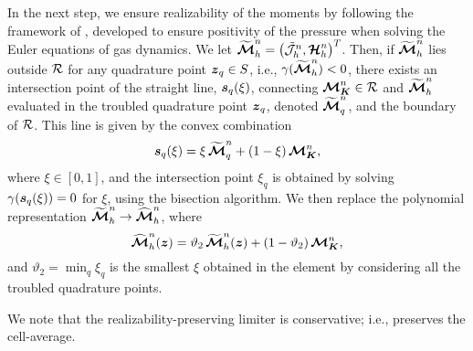 In the next step, we ensure realizability of the moments by following the framework of \cite{zhangShu_2010b}, developed to ensure positivity of the pressure when solving the Euler equations of gas dynamics.  
We let $\widetilde{\boldsymbol{\mathcal{M}}}_{h}^{n}=\big(\tilde{\mathcal{J}}_{h}^{n},\boldsymbol{\mathcal{H}}_{h}^{n}\big)^{T}$.  
Then, if $\widetilde{\boldsymbol{\mathcal{M}}}_{h}^{n}$ lies outside $\mathcal{R}$ for any quadrature point $\boldsymbol{z}_{q}\in S$, i.e., $\gamma(\widetilde{\boldsymbol{\mathcal{M}}}_{h}^{n})<0$, there exists an intersection point of the straight line, $\boldsymbol{s}_{q}(\xi)$, connecting $\boldsymbol{\mathcal{M}}_{\boldsymbol{K}}^{n}\in\mathcal{R}$ and $\widetilde{\boldsymbol{\mathcal{M}}}_{h}^{n}$ evaluated in the troubled quadrature point $\boldsymbol{z}_{q}$, denoted $\widetilde{\boldsymbol{\mathcal{M}}}_{q}^{n}$, and the boundary of $\mathcal{R}$.  
This line is given by the convex combination 
\begin{equation}
  \boldsymbol{s}_{q}(\xi)=\xi\,\widetilde{\boldsymbol{\mathcal{M}}}_{q}^{n}+(1-\xi)\,\boldsymbol{\mathcal{M}}_{\boldsymbol{K}}^{n},
\end{equation}
where $\xi\in[0,1]$, and the intersection point $\xi_{q}$ is obtained by solving $\gamma(\boldsymbol{s}_{q}(\xi))=0$ for $\xi$, using the bisection algorithm.  
We then replace the polynomial representation $\widetilde{\boldsymbol{\mathcal{M}}}_{h}^{n}\to\widehat{\boldsymbol{\mathcal{M}}}_{h}^{n}$, where
\begin{equation}
  \widehat{\boldsymbol{\mathcal{M}}}_{h}^{n}(\boldsymbol{z})=\vartheta_{2}\,\widetilde{\boldsymbol{\mathcal{M}}}_{h}^{n}(\boldsymbol{z})+(1-\vartheta_{2})\,\boldsymbol{\mathcal{M}}_{\boldsymbol{K}}^{n},
\end{equation}
and $\vartheta_{2}=\min_{q}\xi_{q}$ is the smallest $\xi$ obtained in the element by considering all the troubled quadrature points.  

We note that the realizability-preserving limiter is conservative; i.e., preserves the cell-average.  